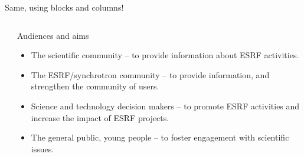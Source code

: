 \documentclass{beamer}
\begin{document}
\begin{frame}[t]{Same, using blocks and columns!}
\begin{columns}[onlytextwidth]
\begin{column}{0.3\textwidth}
\end{column}%
\hfill%
\begin{column}{0.5\textwidth}
\begin{block}{\LARGE Audiences and aims}
\setlength{\leftmargini}{0.9em} %
\begin{itemize}
  \item The scientific community -- to provide information about ESRF activities.
  \item The ESRF/synchrotron community -- to provide information, and strengthen the community of users.
  \item Science and technology decision makers -- to promote ESRF activities and increase the impact of ESRF projects.
  \item The general public, young people -- to foster engagement with scientific issues.
\end{itemize}
\end{block}
\end{column}%
\end{columns}

\end{frame}

\end{document}
